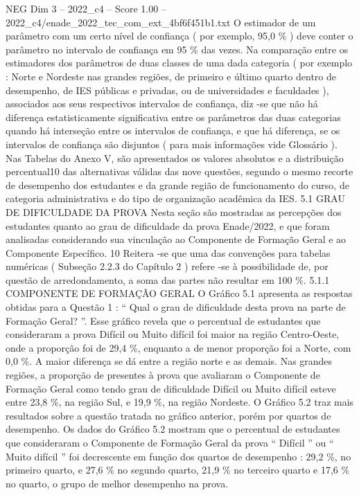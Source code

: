 \begin{textsample}{NEG Dim 3 – 2022\_c4 – Score 1.00 – 2022\_c4/enade\_2022\_tec\_com\_ext\_4bf6f451b1.txt}
O estimador de um parâmetro com um certo nível de confiança ( por exemplo, 95,0 \% ) deve conter o parâmetro no intervalo de confiança em 95 \% das vezes.
Na comparação entre os estimadores dos parâmetros de duas classes de uma dada categoria ( por exemplo : Norte e Nordeste nas grandes regiões, de primeiro e último quarto dentro de desempenho, de IES públicas e privadas, ou de universidades e faculdades ), associados aos seus respectivos intervalos de confiança, diz -se que não há diferença estatisticamente significativa entre os parâmetros das duas categorias quando há interseção entre os intervalos de confiança, e que há diferença, se os intervalos de confiança são disjuntos ( para mais informações vide Glossário ).
Nas Tabelas do Anexo V, são apresentados os valores absolutos e a distribuição percentual10 das alternativas válidas das nove questões, segundo o mesmo recorte de desempenho dos estudantes e da grande região de funcionamento do curso, de categoria administrativa e do tipo de organização acadêmica da IES. 5.1 GRAU DE DIFICULDADE DA PROVA Nesta seção são mostradas as percepções dos estudantes quanto ao grau de dificuldade da prova Enade/2022, e que foram analisadas considerando sua vinculação ao Componente de Formação Geral e ao Componente Específico. 10 Reitera -se que uma das convenções para tabelas numéricas ( Subseção 2.2.3 do Capítulo 2 ) refere -se à possibilidade de, por questão de arredondamento, a soma das partes não resultar em 100 \%. 5.1.1 COMPONENTE DE FORMAÇÃO GERAL O Gráfico 5.1 apresenta as respostas obtidas para a Questão 1 : “ Qual o grau de dificuldade desta prova na parte de Formação Geral? ”.
Esse gráfico revela que o percentual de estudantes que consideraram a prova Difícil ou Muito difícil foi maior na região Centro-Oeste, onde a proporção foi de 29,4 \%, enquanto a de menor proporção foi a Norte, com 0,0 \%.
A maior diferença se dá entre a região norte e as demais.
Nas grandes regiões, a proporção de presentes à prova que avaliaram o Componente de Formação Geral como tendo grau de dificuldade Difícil ou Muito difícil esteve entre 23,8 \%, na região Sul, e 19,9 \%, na região Nordeste.
O Gráfico 5.2 traz mais resultados sobre a questão tratada no gráfico anterior, porém por quartos de desempenho.
Os dados do Gráfico 5.2 mostram que o percentual de estudantes que consideraram o Componente de Formação Geral da prova “ Difícil ” ou “ Muito difícil ” foi decrescente em função dos quartos de desempenho : 29,2 \%, no primeiro quarto, e 27,6 \% no segundo quarto, 21,9 \% no terceiro quarto e 17,6 \% no quarto, o grupo de melhor desempenho na prova.

\end{textsample}
